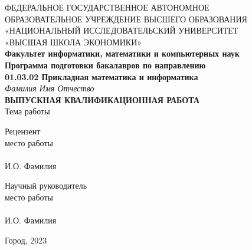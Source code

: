 \begin{titlepage}

    \begin{center}
        ФЕДЕРАЛЬНОЕ  ГОСУДАРСТВЕННОЕ АВТОНОМНОЕ \\
        ОБРАЗОВАТЕЛЬНОЕ УЧРЕЖДЕНИЕ
        ВЫСШЕГО ОБРАЗОВАНИЯ
        «НАЦИОНАЛЬНЫЙ ИССЛЕДОВАТЕЛЬСКИЙ УНИВЕРСИТЕТ \\
        «ВЫСШАЯ ШКОЛА ЭКОНОМИКИ»
\\
\vspace{10mm}
        \textbf {
            Факультет информатики, математики и компьютерных наук \\
            Программа подготовки бакалавров по направлению \\
            01.03.02 Прикладная математика и информатика
        }
        \\
        \vspace{20mm}
        \textit{Фамилия Имя Отчество}
        \\
        \textbf{ВЫПУСКНАЯ КВАЛИФИКАЦИОННАЯ РАБОТА}
        \\
        \vspace{10mm}
        Тема работы
        \vspace{10mm}
    \end{center}

\vspace{50mm}
\begin{minipage}{0.4\textwidth}
    \begin{flushleft}
        Рецензент \\
        место работы \\
        \signatureline[6cm]{}
        \\
        И.О. Фамилия     
    \end{flushleft}
\end{minipage}
\hfill
\begin{minipage}{0.4\textwidth}
    \begin{flushright}
        Научный руководитель \\
        место работы \\
        \signatureline[6cm]{}
        \\
        И.О. Фамилия    
    \end{flushright}
\end{minipage}

\begin{center}
    \vspace*{\fill}
    Город, 2023
\end{center}

\end{titlepage}